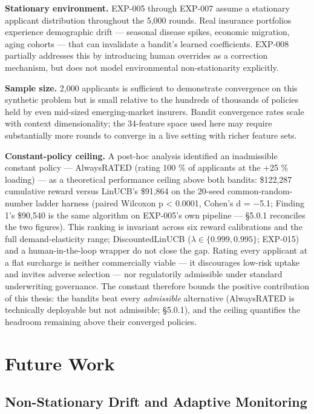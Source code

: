 \textbf{Stationary environment.} EXP-005 through EXP-007 assume a stationary applicant distribution throughout the 5,000 rounds. Real insurance portfolios experience demographic drift --- seasonal disease spikes, economic migration, aging cohorts --- that can invalidate a bandit's learned coefficients. EXP-008 partially addresses this by introducing human overrides as a correction mechanism, but does not model environmental non-stationarity explicitly.

\textbf{Sample size.} 2,000 applicants is sufficient to demonstrate convergence on this synthetic problem but is small relative to the hundreds of thousands of policies held by even mid-sized emerging-market insurers. Bandit convergence rates scale with context dimensionality; the 34-feature space used here may require substantially more rounds to converge in a live setting with richer feature sets.

\textbf{Constant-policy ceiling.} A post-hoc analysis identified an inadmissible constant policy --- AlwaysRATED (rating 100 \% of applicants at the +25 \% loading) --- as a theoretical performance ceiling above both bandits: \$122,287 cumulative reward versus LinUCB's \$91,864 on the 20-seed common-random-number ladder harness (paired Wilcoxon p \textless{} 0.0001, Cohen's d = −5.1; Finding 1's \$90,540 is the same algorithm on EXP-005's own pipeline --- §5.0.1 reconciles the two figures). This ranking is invariant across six reward calibrations and the full demand-elasticity range; DiscountedLinUCB (\(\lambda \in \{0.999, 0.995\}\); EXP-015) and a human-in-the-loop wrapper do not close the gap. Rating every applicant at a flat surcharge is neither commercially viable --- it discourages low-risk uptake and invites adverse selection --- nor regulatorily admissible under standard underwriting governance. The constant therefore bounds the positive contribution of this thesis: the bandits beat every \emph{admissible} alternative (AlwaysRATED is technically deployable but not admissible; §5.0.1), and the ceiling quantifies the headroom remaining above their converged policies.

\section{Future Work}\label{future-work}

\subsection{Non-Stationary Drift and Adaptive Monitoring}\label{non-stationary-drift-and-adaptive-monitoring}


